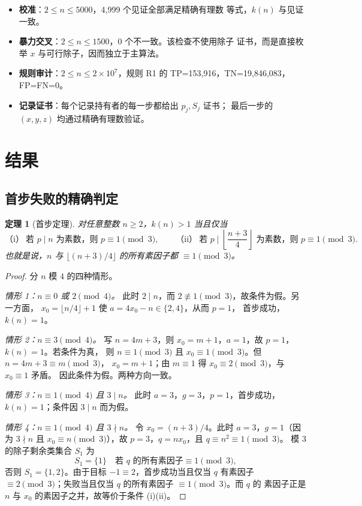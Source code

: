 \documentclass[11pt,a4paper]{ctexart}
\newtheorem{theorem}{定理}[section]
\theoremstyle{definition}
\theoremstyle{remark}
\begin{document}
\begin{itemize}
\item \textbf{校准}：$2\le n\le5000$，4{,}999 个见证全部满足精确有理数
等式，$k(n)$ 与见证一致。
\item \textbf{暴力交叉}：$2\le n\le1500$，0 个不一致。该检查不使用除子
证书，而是直接枚举 $x$ 与可行除子，因而独立于主算法。
\item \textbf{规则审计}：$2\le n\le2\times10^7$，规则 R1 的
TP=153{,}916，TN=19{,}846{,}083，FP=FN=0。
\item \textbf{记录证书}：每个记录持有者的每一步都给出 $p_j,S_j$ 证书；
最后一步的 $(x,y,z)$ 均通过精确有理数验证。
\end{itemize}

\section{结果}

\subsection{首步失败的精确判定}

\begin{theorem}[首步定理]\label{thm:main}
对任意整数 $n\ge2$，$k(n)>1$ 当且仅当
\[
\text{（i）}\ \text{若 } p\mid n \text{ 为素数，则 } p\equiv1\pmod3,
\qquad
\text{（ii）}\ \text{若 } p\mid \left\lfloor\frac{n+3}{4}\right\rfloor
\text{ 为素数，则 } p\equiv1\pmod3 .
\]
也就是说，$n$ 与 $\lfloor(n+3)/4\rfloor$ 的所有素因子都 $\equiv1\pmod3$。
\end{theorem}

\begin{proof}
分 $n$ 模 $4$ 的四种情形。

\emph{情形 1：$n\equiv0$ 或 $2\pmod4$。}
此时 $2\mid n$，而 $2\not\equiv1\pmod3$，故条件为假。另一方面，
$x_0=\lfloor n/4\rfloor+1$ 使 $a=4x_0-n\in\{2,4\}$，从而 $p=1$，
首步成功，$k(n)=1$。

\emph{情形 2：$n\equiv3\pmod4$。}
写 $n=4m+3$，则 $x_0=m+1$，$a=1$，故 $p=1$，$k(n)=1$。若条件为真，
则 $n\equiv1\pmod3$ 且 $x_0\equiv1\pmod3$。但 $n=4m+3\equiv m\pmod3$，
$x_0=m+1$；由 $m\equiv1$ 得 $x_0\equiv2\pmod3$，与 $x_0\equiv1$ 矛盾。
因此条件为假。两种方向一致。

\emph{情形 3：$n\equiv1\pmod4$ 且 $3\mid n$。}
此时 $a=3$，$g=3$，$p=1$，首步成功，$k(n)=1$；条件因 $3\mid n$ 而为假。

\emph{情形 4：$n\equiv1\pmod4$ 且 $3\nmid n$。}
令 $x_0=(n+3)/4$。此时 $a=3$，$g=1$（因为 $3\nmid n$ 且
$x_0\equiv n\pmod3$），故 $p=3$，$q=nx_0$，且 $q\equiv n^2\equiv1\pmod3$。
模 $3$ 的除子剩余类集合 $S_1$ 为
\[
S_1=\{1\}\quad\text{若 }q\text{ 的所有素因子}\equiv1\pmod3,
\]
否则 $S_1=\{1,2\}$。由于目标 $-1\equiv2$，首步成功当且仅当 $q$ 有素因子
$\equiv2\pmod3$；失败当且仅当 $q$ 的所有素因子 $\equiv1\pmod3$。而 $q$ 的
素因子正是 $n$ 与 $x_0$ 的素因子之并，故等价于条件 (i)(ii)。
\end{proof}
\end{document}
